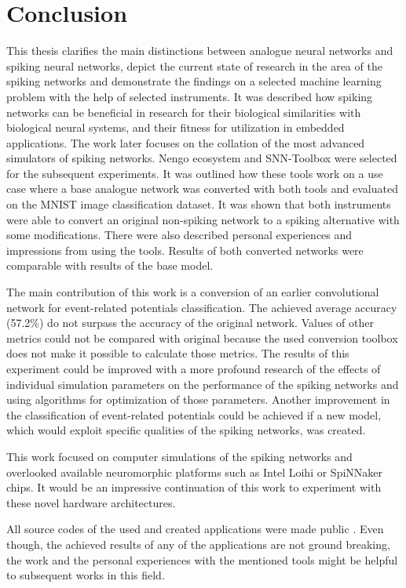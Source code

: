 \chapter{Conclusion} \label{chap:07}

This thesis clarifies the main distinctions between analogue neural networks and spiking neural networks, depict the current state of research in the area of the spiking networks and demonstrate the findings on a selected machine learning problem with the help of selected instruments. It was described how spiking networks can be beneficial in research for their biological similarities with biological neural systems, and their fitness for utilization in embedded applications. The work later focuses on the collation of the most advanced simulators of spiking networks. Nengo ecosystem and SNN-Toolbox were selected for the subsequent experiments. It was outlined how these tools work on a use case where a base analogue network was converted with both tools and evaluated on the MNIST image classification dataset. It was shown that both instruments were able to convert an original non-spiking network to a spiking alternative with some modifications. There were also described personal experiences and impressions from using the tools. Results of both converted networks were comparable with results of the base model. \par
The main contribution of this work is a conversion of an earlier convolutional network for event-related potentials classification. The achieved average accuracy (57.2\%) do not surpass the accuracy of the original network. Values of other metrics could not be compared with original because the used conversion toolbox does not make it possible to calculate those metrics. The results of this experiment could be improved with a more profound research of the effects of individual simulation parameters on the performance of the spiking networks and using algorithms for optimization of those parameters. Another improvement in the classification of event-related potentials could be achieved if a new model, which would exploit specific qualities of the spiking networks, was created. \par
This work focused on computer simulations of the spiking networks and overlooked available neuromorphic platforms such as Intel Loihi or SpiNNaker chips. It would be an impressive continuation of this work to experiment with these novel hardware architectures. \par
All source codes of the used and created applications were made public \footnotemark. Even though, the achieved results of any of the applications are not ground breaking, the work and the personal experiences with the mentioned tools might be helpful to subsequent works in this field.
